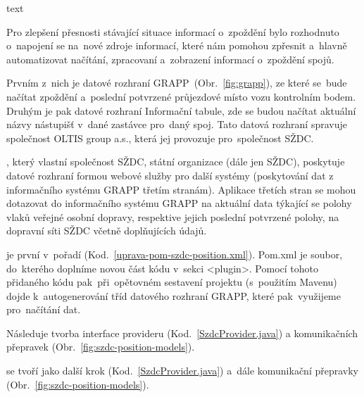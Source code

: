 text


Pro zlepšení přesnosti stávající situace informací o~zpoždění bylo rozhodnuto o~napojení se na~nové zdroje informací, které nám pomohou zpřesnit a~hlavně automatizovat načítání, zpracovaní a~zobrazení informací o~zpoždění spojů.

Prvním z~nich je datové rozhraní GRAPP~(Obr.~\ref{fig:grapp}), ze které se~bude načítat zpoždění a~poslední potvrzené průjezdové místo vozu kontrolním bodem. Druhým je pak datové rozhraní Informační tabule, zde se budou načítat aktuální názvy nástupišť v~dané zastávce pro~daný spoj. Tato datová rozhraní spravuje společnost OLTIS group a.s., která jej provozuje pro~společnost SŽDC.



, který vlastní společnost SŽDC, státní organizace (dále jen SŽDC), poskytuje datové rozhraní formou webové služby pro další systémy (poskytování dat z informačního systému GRAPP třetím stranám). Aplikace třetích stran se mohou dotazovat do informačního systému GRAPP na aktuální data týkající se polohy vlaků veřejné osobní dopravy, respektive jejich poslední potvrzené polohy, na dopravní síti SŽDC včetně doplňujících údajů.

je první v~pořadí (Kod.~\ref{uprava-pom-szdc-position.xml}). Pom.xml je soubor, do~kterého doplníme novou část kódu v~sekci <plugin>. Pomocí tohoto přidaného kódu pak~při~opětovném sestavení projektu (s~použitím Mavenu) dojde k~autogenerování tříd datového rozhraní GRAPP, které pak~využijeme pro~načítání dat.

Následuje tvorba interface provideru (Kod.~\ref{SzdcProvider.java}) a komunikačních přepravek (Obr.~\ref{fig:szdc-position-models}).

 se tvoří jako další krok (Kod.~\ref{SzdcProvider.java}) a~dále komunikační přepravky (Obr.~\ref{fig:szdc-position-models}).
 	

